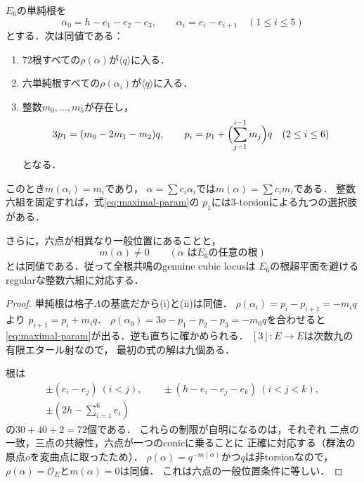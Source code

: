 \begin{theorem}[全$E_6$根の共鳴チャートの整数表示]
\label{thm:maximal-resonance}
$E_6$の単純根を
\[
 \alpha_0=h-e_1-e_2-e_3,\qquad
 \alpha_i=e_i-e_{i+1}\quad(1\le i\le5)
\]
とする．次は同値である：
\begin{enumerate}
\item 72根すべての$\rho(\alpha)$が$\langle q\rangle$に入る．
\item 六単純根すべての$\rho(\alpha_i)$が$\langle q\rangle$に入る．
\item 整数$m_0,\ldots,m_5$が存在し，
\begin{equation}\label{eq:maximal-param}
 3p_1=(m_0-2m_1-m_2)q,\qquad
 p_i=p_1+\Bigl(\sum_{j=1}^{i-1}m_j\Bigr)q
 \quad(2\le i\le6)
\end{equation}
となる．
\end{enumerate}
このとき$m(\alpha_i)=m_i$であり，
$\alpha=\sum c_i\alpha_i$では$m(\alpha)=\sum c_im_i$である．
整数六組を固定すれば，式\eqref{eq:maximal-param}の
$p_1$には$3$-torsionによる九つの選択肢がある．

さらに，六点が相異なり一般位置にあることと，
\[
 m(\alpha)\ne0 \qquad
 (\alpha\text{ は$E_6$の任意の根})
\]
とは同値である．従って全根共鳴のgenuine cubic locusは
$E_6$の根超平面を避けるregularな整数六組に対応する．
\end{theorem}
\begin{proof}
単純根は格子$\Lambda$の基底だから(i)と(ii)は同値．
$\rho(\alpha_i)=p_i-p_{i+1}=-m_iq$より
$p_{i+1}=p_i+m_iq$．
$\rho(\alpha_0)=3o-p_1-p_2-p_3=-m_0q$を合わせると
\eqref{eq:maximal-param}が出る．逆も直ちに確かめられる．
$[3]:E\to E$は次数九の有限エタール射なので，
最初の式の解は九個ある．

根は
\[
\begin{gathered}
\pm(e_i-e_j)\ (i<j),\qquad
\pm(h-e_i-e_j-e_k)\ (i<j<k),\\
\pm(2h-\textstyle\sum_{i=1}^6e_i)
\end{gathered}
\]
の$30+40+2=72$個である．
これらの制限が自明になるのは，それぞれ
二点の一致，三点の共線性，六点が一つのconicに乗ることに
正確に対応する（群法の原点$o$を変曲点に取ったため）．
$\rho(\alpha)=q^{-m(\alpha)}$かつ$q$は非torsionなので，
$\rho(\alpha)=\mathcal O_E$と$m(\alpha)=0$は同値．
これは六点の一般位置条件に等しい．
\end{proof}

